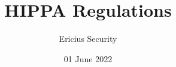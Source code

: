 \documentclass[10pt, letterpaper, oneside, BCOR=5mm]{scrartcl}
\title{HIPPA Regulations}
\author{Ericius Security}
\date{01 June 2022}
\begin{document}
    \maketitle
    \pagebreak
    \tableofcontents
    \pagebreak
    
    \pagebreak
    
    \pagebreak
    
    \pagebreak
    
    \pagebreak
    
    \pagebreak
    
    \pagebreak
    \nocite{*}
    
    
\end{document}
